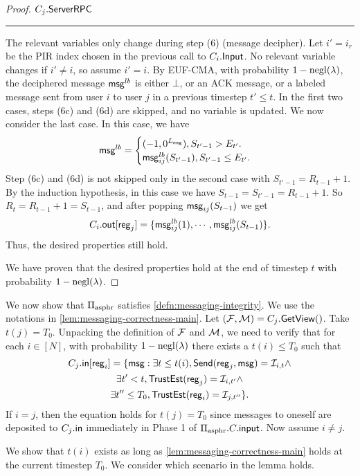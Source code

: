 \begin{proof}
\vspace{10pt}
$C_j.\mathsf{ServerRPC}$
\hrule
The relevant variables only change during step (6) (message decipher). Let $i' = i_r$ be the PIR index chosen in the previous call to $C_i.\mathsf{Input}$. No relevant variable changes if $i' \neq i$, so assume $i' = i$. By EUF-CMA, with probability $1 - \operatorname{negl}(\lambda)$, the deciphered message $\mathsf{msg}^{lb}$ is either $\bot$, or an ACK message, or a labeled message sent from user $i$ to user $j$ in a previous timestep $t' \leq t$.  In the first two cases, steps (6c) and (6d) are skipped, and no variable is updated. We now consider the last case. In this case, we have
$$\mathsf{msg}^{lb} = \begin{cases}
(-1, 0^{L_{\mathsf{msg}}}), S_{t' - 1} > E_{t'}. \\
\mathsf{msg}_{ij}^{lb}(S_{t' - 1}), S_{t' - 1} \leq E_{t'}. 
\end{cases}$$
Step (6c) and (6d) is not skipped only in the second case with $S_{t' - 1} = R_{t - 1} + 1$. By the induction hypothesis, in  this case we have $S_{t - 1} = S_{t' - 1} = R_{t - 1} + 1$. So $R_t = R_{t - 1} + 1 = S_{t - 1}$, and after popping $\mathsf{msg}_{ij}(S_{t - 1})$ we get
$$C_i.\mathsf{out}[\mathsf{reg}_j] = \{\mathsf{msg}^{lb}_{ij}(1), \cdots, \mathsf{msg}^{lb}_{ij}(S_{t - 1})\}.$$
Thus, the desired properties still hold.

We have proven that the desired properties hold at the end of timestep $t$ with probability $1 - \operatorname{negl}(\lambda)$.
\end{proof}
We now show that $\Pi_{\text{asphr}}$ satisfies \cref{defn:messaging-integrity}. We use the notations in \cref{lem:messaging-correctness-main}. Let $(\mathcal{F}, \mathcal{M}) = C_j.\mathsf{GetView}()$. Take $t(j) = T_0$. Unpacking the definition of $\mathcal{F}$ and $\mathcal{M}$, we need to verify that for each $i \in [N]$, with probability $1 - \operatorname{negl}(\lambda)$ there exists a $t(i) \leq T_0$ such that
 \begin{multline*}
 C_j.\mathsf{in}[\mathsf{reg}_i] = \{\mathsf{msg}: \exists t \leq t(i), \mathsf{Send}(\mathsf{reg}_j, \mathsf{msg}) = \mathcal{I}_{i, t} \land \\
 \exists t' < t, \mathsf{TrustEst}(\mathsf{reg}_j) = \mathcal{I}_{i, t'} \land \\
 \exists t'' \leq T_0, \mathsf{TrustEst}(\mathsf{reg}_i) = \mathcal{I}_{j, t''}\}.   
 \end{multline*} 
  If $i = j$, then the equation holds for $t(j) = T_0$ since messages to oneself are deposited to $C_j.\mathsf{in}$ immediately in Phase 1 of $\Pi_{\text{asphr}}.C.\mathsf{input}$. Now assume $i \neq j.$ 
 
 We show that $t(i)$ exists as long as \cref{lem:messaging-correctness-main} holds at the current timestep $T_0$. We consider which scenario in the lemma holds. 
 
